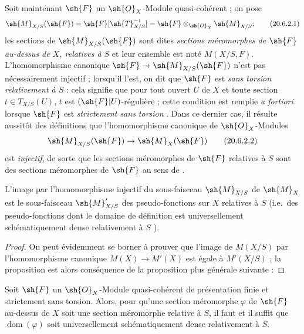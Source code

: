 \begin{env}[20.6.2]
Soit maintenant $\sh{F}$ un $\sh{O}_X$-Module quasi-cohérent ; on pose
\[
\label{IV.20.6.2.1}
  \sh{M}_{X/S}(\sh{F})=\sh{F}[\sh{T}_{X/S}^{-1}]=\sh{F}\otimes_{\sh{O}_X}\sh{M}_{X/S};
  \tag{20.6.2.1}
\]
les sections de $\sh{M}_{X/S}(\sh{F})$ sont dites \emph{sections méromorphes de $\sh{F}$ au-dessus de $X$, relatives à $S$} et leur ensemble est noté $M(X/S,F)$.
L'homomorphisme canonique $\sh{F}\to\sh{M}_{X/S}(\sh{F})$ n'est pas nécessairement injectif ; lorsqu'il l'est, on dit que $\sh{F}$ est \emph{sans torsion relativement à $S$} : cela signifie que pour tout ouvert $U$ de $X$ et toute section $t\in T_{X/S}(U)$, $t$ est $(\sh{F}|U)$-régulière ; cette condition est remplie \emph{a fortiori} lorsque $\sh{F}$ est \emph{strictement sans torsion} .
Dans ce dernier cas, il résulte aussitôt des définitions  que l'homomorphisme canonique de $\sh{O}_X$-Modules
\[
\label{IV.20.6.2.2}
  \sh{M}_{X/S}(\sh{F})\to\sh{M}_X(\sh{F})
  \tag{20.6.2.2}
\]
est \emph{injectif}, de sorte que les sections méromorphes de $\sh{F}$ relatives à $S$ sont des sections méromorphes de $\sh{F}$ au sens de .
\end{env}

\begin{proposition}[20.6.3]
\label{IV.20.6.3}
L'image par l'homomorphisme injectif  du sous-faisceau $\sh{M}_{X/S}$ de $\sh{M}_X$ est le sous-faisceau $\sh{M}'_{X/S}$ des pseudo-fonctions sur $X$ relatives à $S$ (i.e.\ des pseudo-fonctions dont le domaine de définition est universellement schématiquement dense relativement à $S$ ).
\end{proposition}

\begin{proof}
On peut évidemment se borner à prouver que l'image de $M(X/S)$ par l'homomorphisme canonique $M(X)\to M'(X)$ est égale à $M'(X/S)$ ; la proposition est alors conséquence de la proposition plus générale suivante :
\end{proof}

\begin{proposition}[20.6.4]
\label{IV.20.6.4}
Soit $\sh{F}$ un $\sh{O}_X$-Module quasi-cohérent de présentation finie et strictement sans torsion.
Alors, pour qu'une section méromorphe $\varphi$ de $\sh{F}$ au-dessus de $X$ soit une section méromorphe relative à $S$, il faut et il suffit que $\operatorname{dom}(\varphi)$ soit universellement schématiquement dense relativement à $S$.
\end{proposition}

